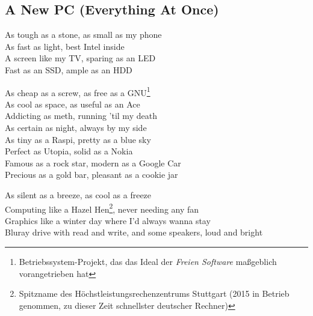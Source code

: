 \subsection{A New PC (Everything At Once)}

As tough as a stone, as small as my phone \\
As fast as light, best Intel inside \\
A screen like my TV, sparing as an LED \\
Fast as an SSD, ample as an HDD \\


As cheap as a screw, as free as a GNU\footnote{\scriptsize Betriebssystem-Projekt, das das Ideal der \textit{Freien Software} maßgeblich vorangetrieben hat} \\
As cool as space, as useful as an Ace \\
Addicting as meth, running 'til my death \\
As certain as night, always by my side \\

As tiny as a Raspi, pretty as a blue sky \\
Perfect as Utopia, solid as a Nokia \\
Famous as a rock star, modern as a Google Car \\
Precious as a gold bar, pleasant as a cookie jar \\


\pagebreak

As silent as a breeze, as cool as a freeze \\
Computing like a Hazel Hen\footnote{\scriptsize Spitzname des Höchstleistungsrechenzentrums Stuttgart (2015 in Betrieb genommen, zu dieser Zeit schnellster deutscher Rechner)}, never needing any fan \\
Graphics like a winter day where I’d always wanna stay \\
Bluray drive with read and write, and some speakers, loud and bright \\

